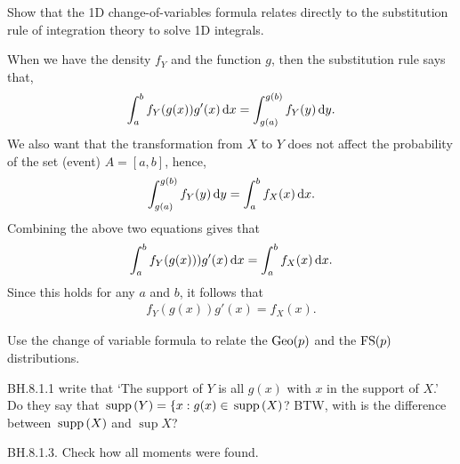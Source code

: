 \begin{exercise}
Show that the 1D change-of-variables formula relates directly to the substitution rule of integration theory to solve 1D integrals.
\begin{solution}
When we have the density  $f_{Y}$ and the function $g$, then the substitution rule says that,
\begin{align*}
\int_{a}^b f_{Y}(g(x)) g'(x)\,\textrm{d}x = \int_{g(a)}^{g(b)} f_{Y}(y) \,\textrm{d}y.
\end{align*}
We also want that the transformation from $X$ to $Y$ does not affect the probability of the set (event) $A = [a,b]$, hence,
\begin{align*}
\int_{g(a)}^{g(b)} f_{Y}(y) \,\textrm{d}y = \int_{a}^{b} f_{X}(x) \,\textrm{d}x.
\end{align*}
Combining the above two equations gives that
\begin{align*}
\int_{a}^{b} f_{Y}(g(x))) g'(x) \,\textrm{d}x = \int_{a}^{b} f_{X}(x) \,\textrm{d}x.
\end{align*}
Since this holds for any $a$ and $b$, it follows that
\begin{align*}
f_{Y}(g(x)) g'(x) = f_{X}(x).
\end{align*}
\end{solution}
\end{exercise}

\begin{exercise}
Use the change of variable formula to relate the $\mathrm{Geo}(p)$ and the $\mathrm{FS}(p)$ distributions.
\begin{hint}
\end{hint}
\begin{solution}
\end{solution}
\end{exercise}

\begin{exercise}
BH.8.1.1 write that `The support of $Y$ is all $g(x)$ with $x$ in the support of $X$.' Do they say that $\,\mathrm{supp}\left(Y\right) = \{x : g(x) \in \,\mathrm{supp}\left(X\right)$? BTW, with is the difference between $\,\mathrm{supp}\left(X\right)$ and $\sup{X}$?
\begin{hint}
\end{hint}
\begin{solution}
\end{solution}
\end{exercise}


\begin{exercise}
BH.8.1.3. Check how all moments were found.
\begin{hint}
\end{hint}
\begin{solution}
\end{solution}
\end{exercise}

